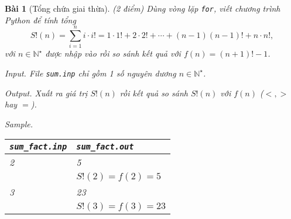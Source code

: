 \documentclass{article}
\newtheorem{baitoan}{Bài}
\begin{document}
\begin{baitoan}[Tổng chứa giai thừa]
	{\rm(2 điểm)} Dùng vòng lặp {\tt for}, viết chương trình Python để tính tổng
	\begin{equation*}
		S!(n) = \sum_{i=1}^n i\cdot i! = 1\cdot1! + 2\cdot2! + \cdots + (n - 1)(n - 1)! + n\cdot n!,
	\end{equation*}
	với $n\in\mathbb{N}^\star$ được nhập vào rồi so sánh kết quả với $f(n) = (n + 1)! - 1$.
	\item {\sf Input.} File {\tt sum.inp} chỉ gồm 1 số nguyên dương $n\in\mathbb{N}^\star$.
	\item {\sf Output.} Xuất ra giá trị $S!(n)$ rồi kết quả so sánh $S!(n)$ với $f(n)$ ($<,>$ hay $=$).
	\item {\sf Sample.}
	\begin{table}[H]
		\centering
		\begin{tabular}{|l|l|}
			\hline
			\verb|sum_fact.inp| & \verb|sum_fact.out| \\
			\hline
			2 & 5 \\
			& $S!(2) = f(2) = 5$ \\
			\hline
			3 & 23 \\
			& $S!(3) = f(3) = 23$ \\
			\hline
		\end{tabular}
	\end{table}
\end{baitoan}
\end{document}

